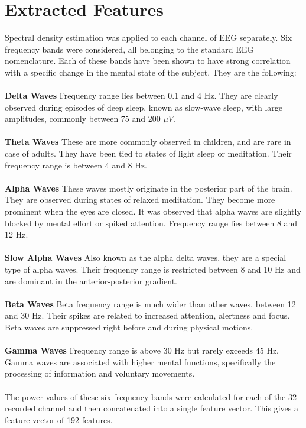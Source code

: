 \documentclass[12pt, a4paper, fleqn]{memoir}%
\begin{document}
\section{Extracted Features}
\label{sec:ExtractedFeatures}
Spectral density estimation was applied to each channel of EEG separately. Six frequency bands were considered, all belonging to the standard EEG nomenclature. Each of these bands have been shown to have strong correlation with a specific change in the mental state of the subject. They are the following:\\
\\
\textbf{Delta Waves} Frequency range lies between 0.1 and 4 Hz. They are clearly observed during episodes of deep sleep, known as slow-wave sleep, with large amplitudes, commonly between 75 and 200 $\mu V$.\\
\\
\textbf{Theta Waves} These are more commonly observed in children, and are rare in case of adults. They have been tied to states of light sleep or meditation. Their frequency range is between 4 and 8 Hz.\\
\\
\textbf{Alpha Waves} These waves mostly originate in the posterior part of the brain. They are observed during states of relaxed meditation. They become more prominent when the eyes are closed. It was observed that alpha waves are slightly blocked by mental effort or spiked attention. Frequency range lies between 8 and 12 Hz.\\
\\
\textbf{Slow Alpha Waves} Also known as the alpha delta waves, they are a special type of alpha waves. Their frequency range is restricted between 8 and 10 Hz and are dominant in the anterior-posterior gradient.\\
\\
\textbf{Beta Waves} Beta frequency range is much wider than other waves, between 12 and 30 Hz. Their spikes are related to increased attention, alertness and focus. Beta waves are suppressed right before and during physical motions.\\
\\
\textbf{Gamma Waves} Frequency range is above 30 Hz but rarely exceeds 45 Hz. Gamma waves are associated with higher mental functions, specifically the processing of information and voluntary movements.\\
\\
The power values of these six frequency bands were calculated for each of the 32 recorded channel and then concatenated into a single feature vector. This gives a feature vector of 192 features.
\end{document}
